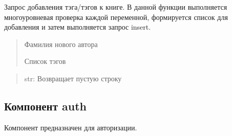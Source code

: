 \documentclass[letterpaper,10pt,russian]{sphinxmanual}
\begin{document}
\begin{fulllineitems}
\label{\detokenize{blueprints:blueprints.add_to_database.change_add_tag}}
\pysigstartsignatures
{}
\pysigstopsignatures
\sphinxAtStartPar
Запрос добавления тэга/тэгов к книге.
В данной функции выполняется многоуровневая проверка каждой переменной,
формируется список для добавления и затем выполняется запрос insert.
\begin{description}
\begin{quote}\begin{description}
\sphinxAtStartPar
Фамилия нового автора

\sphinxAtStartPar
Список тэгов

\end{description}\end{quote}

\end{description}
\begin{quote}\begin{description}
\sphinxAtStartPar
str: Возвращает пустую строку

\end{description}\end{quote}

\end{fulllineitems}



\subsection{Компонент auth}
\label{\detokenize{blueprints:auth}}
\begin{DUlineblock}{0em}
\item[] Компонент предназначен для авторизации.
\end{DUlineblock}
\label{\detokenize{blueprints:module-blueprints.auth}}
\end{document}
